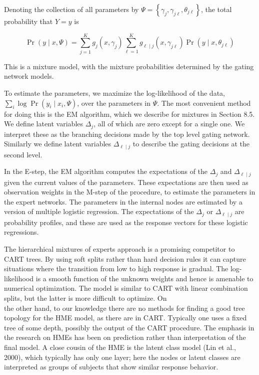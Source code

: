 \documentclass[10pt]{article}
\begin{document}
Denoting the collection of all parameters by $\Psi=\left\{\gamma_{j}, \gamma_{j \ell}, \theta_{j \ell}\right\}$, the total probability that $Y=y$ is


\begin{equation*}
\operatorname{Pr}(y \mid x, \Psi)=\sum_{j=1}^{K} g_{j}\left(x, \gamma_{j}\right) \sum_{\ell=1}^{K} g_{\ell \mid j}\left(x, \gamma_{j \ell}\right) \operatorname{Pr}\left(y \mid x, \theta_{j \ell}\right) \tag{9.30}
\end{equation*}


This is a mixture model, with the mixture probabilities determined by the gating network models.

To estimate the parameters, we maximize the log-likelihood of the data, $\sum_{i} \log \operatorname{Pr}\left(y_{i} \mid x_{i}, \Psi\right)$, over the parameters in $\Psi$. The most convenient method for doing this is the EM algorithm, which we describe for mixtures in Section 8.5. We define latent variables $\Delta_{j}$, all of which are zero except for a single one. We interpret these as the branching decisions made by the top level gating network. Similarly we define latent variables $\Delta_{\ell \mid j}$ to describe the gating decisions at the second level.

In the E-step, the EM algorithm computes the expectations of the $\Delta_{j}$ and $\Delta_{\ell \mid j}$ given the current values of the parameters. These expectations are then used as observation weights in the M-step of the procedure, to estimate the parameters in the expert networks. The parameters in the internal nodes are estimated by a version of multiple logistic regression. The expectations of the $\Delta_{j}$ or $\Delta_{\ell \mid j}$ are probability profiles, and these are used as the response vectors for these logistic regressions.

The hierarchical mixtures of experts approach is a promising competitor to CART trees. By using soft splits rather than hard decision rules it can capture situations where the transition from low to high response is gradual. The log-likelihood is a smooth function of the unknown weights and hence is amenable to numerical optimization. The model is similar to CART with linear combination splits, but the latter is more difficult to optimize. On\\
the other hand, to our knowledge there are no methods for finding a good tree topology for the HME model, as there are in CART. Typically one uses a fixed tree of some depth, possibly the output of the CART procedure. The emphasis in the research on HMEs has been on prediction rather than interpretation of the final model. A close cousin of the HME is the latent class model (Lin et al., 2000), which typically has only one layer; here the nodes or latent classes are interpreted as groups of subjects that show similar response behavior.
\end{document}

